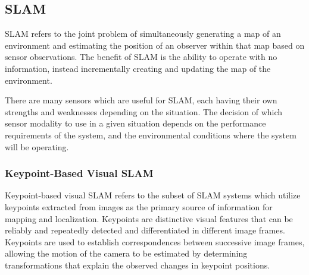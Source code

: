 \subsection{SLAM}

SLAM refers to the joint problem of simultaneously generating a map of an environment and estimating the position of an observer within that map based on sensor observations. The benefit of SLAM is the ability to operate with no information, instead incrementally creating and updating the map of the environment.

There are many sensors which are useful for SLAM, each having their own strengths and weaknesses depending on the situation. The decision of which sensor modality to use in a given situation depends on the performance requirements of the system, and the environmental conditions where the system will be operating.

\subsubsection{Keypoint-Based Visual SLAM}

Keypoint-based visual SLAM refers to the subset of SLAM systems which utilize keypoints extracted from images as the primary source of information for mapping and localization. Keypoints are distinctive visual features that can be reliably and repeatedly detected and differentiated in different image frames. Keypoints are used to establish correspondences between successive image frames, allowing the motion of the camera to be estimated by determining transformations that explain the observed changes in keypoint positions.

% 



